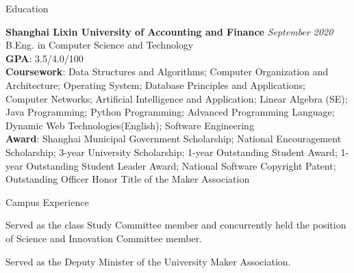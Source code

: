 \documentclass{resume} %
\begin{document}


\begin{rSection}{Education}

  \textbf{Shanghai Lixin University of Accounting and Finance} \hfill \textit{September 2020} \\
  B.Eng. in Computer Science and Technology\\
  \textbf{GPA}: 3.5/4.0/100\\
  \textbf{Coursework}: Data Structures and Algorithms; Computer Organization and Architecture; Operating System; Database Principles and Applications; Computer Networks; Artificial Intelligence and Application; Linear Algebra (SE); Java Programming; Python Programming; Advanced Programming Language; Dynamic Web Technologies(English); Software Engineering\\
  \textbf{Award}: Shanghai Municipal Government Scholarship; National Encouragement Scholarship; 3-year University Scholarship; 1-year Outstanding Student Award; 1-year Outstanding Student Leader Award;  National Software Copyright Patent; Outstanding Officer Honor Title of the Maker Association
\end{rSection}

\begin{rSection}{Campus Experience}
  \begin{rSubsection}{}{}{}{}
    \item {Served as the class Study Committee member and concurrently held the position of Science and Innovation Committee member.}
    \item {Served as the Deputy Minister of the University Maker Association.}
    \end{rSubsection}

\end{rSection}
\end{document}
